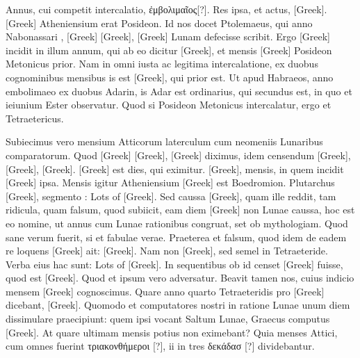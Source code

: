Annus, cui competit intercalatio, \textgreek{ἐμβολιμαῖος[?]}.
Res ipsa, et
actus, \textgreek{[Greek]}.
\textgreek{[Greek]} Atheniensium erat Posideon.
Id nos
docet Ptolemaeus, qui anno Nabonassari , \textgreek{[Greek]}
\textgreek{[Greek]}, \textgreek{[Greek]} Lunam defecisse scribit.
Ergo \textgreek{[Greek]} incidit in illum annum, qui ab eo dicitur
 \textgreek{[Greek]}, et mensis \textgreek{[Greek]} Posideon Metonicus prior.
Nam in omni
iusta ac legitima intercalatione, ex duobus
cognominibus mensibus is est \textgreek{[Greek]},
qui prior est.
Ut apud Habraeos, anno
embolimaeo ex duobus Adarin, is Adar
est ordinarius, qui secundus est, in quo et
ieiunium Ester observatur.
Quod si Posideon
Metonicus intercalatur, ergo et Tetraetericus.
\begin{table}[htbp]
  
\end{table}
Subiecimus vero mensium Atticorum
laterculum cum neomeniis Lunaribus
comparatorum.
Quod \textgreek{[Greek]}
\textgreek{[Greek]}, \textgreek{[Greek]} diximus,
idem censendum \textgreek{[Greek]}, \textgreek{[Greek]},
\textgreek{[Greek]}.
\textgreek{[Greek]} est dies, qui eximitur.
\textgreek{[Greek]}, mensis, in quem incidit
 \textgreek{[Greek]} ipsa.
Mensis igitur Atheniensium
\textgreek{[Greek]} est Boedromion.
Plutarchus \textgreek{[Greek]}, segmento
: \textgreek{Lots of [Greek]}.
Sed caussa
\textgreek{[Greek]}, quam ille reddit, tam ridicula, quam falsum,
 quod subiicit,
eam diem \textgreek{[Greek]} non Lunae caussa, hoc est eo nomine, ut
annus cum Lunae rationibus congruat, set ob mythologiam.
Quod
sane verum fuerit, si et fabulae verae.
Praeterea et falsum, quod idem
de eadem re loquens \textgreek{[Greek]} ait: \textgreek{[Greek]}.
Nam non \textgreek{[Greek]}, sed semel in Tetraeteride.
Verba eius
hac sunt: \textgreek{Lots of [Greek]}.
In sequentibus ob id censet \textgreek{[Greek]} fuisse,
 quod est \textgreek{[Greek]}.
Quod et ipsum vero adversatur.
Beavit tamen nos, cuius
indicio mensem \textgreek{[Greek]} cognoscimus.
Quare anno quarto
Tetraeteridis pro \textgreek{[Greek]} dicebant, \textgreek{[Greek]}.
Quomodo
et computatores nostri in ratione Lunae unum diem dissimulare
praecipiunt: quem ipsi vocant Saltum Lunae,
 Graecus computus \textgreek{[Greek]}.
At quare ultimam mensis potius non eximebant?
Quia
menses Attici, cum omnes fuerint \textgreek{τριακονθήμεροι [?]},
 ii in tres \textgreek{δεκάδασ [?]} dividebantur.

